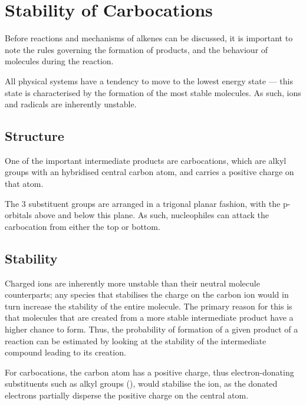 	\section{Stability of Carbocations}

		Before reactions and mechanisms of alkenes can be discussed, it is important to note the rules governing the formation
		of products, and the behaviour of molecules during the reaction.

		All physical systems have a tendency to move to the lowest energy state –– this state is characterised by the formation
		of the most stable molecules. As such, ions and radicals are inherently unstable.

		\subsection{Structure}

			One of the important intermediate products are carbocations, which are alkyl groups with an \sptwo hybridised
			central carbon atom, and carries a positive charge on that atom.


			The 3 substituent groups are arranged in a trigonal planar fashion, with the p-orbitals above and below this
			plane. As such, nucleophiles can attack the carbocation from either the top or bottom.



		\subsection{Stability}

			Charged ions are inherently more unstable than their neutral molecule counterparts; any species that stabilises
			the charge on the carbon ion would in turn increase the stability of the entire molecule. The primary reason for
			this is that molecules that are created from a more stable intermediate product have a higher chance to form. Thus,
			the probability of formation of a given product of a reaction can be estimated by looking at the stability of
			the intermediate compound leading to its creation.

			For carbocations, the carbon atom has a positive charge, thus electron-donating substituents such as alkyl
			groups (), would stabilise the ion, as the donated electrons partially disperse the positive charge on the
			central atom.

